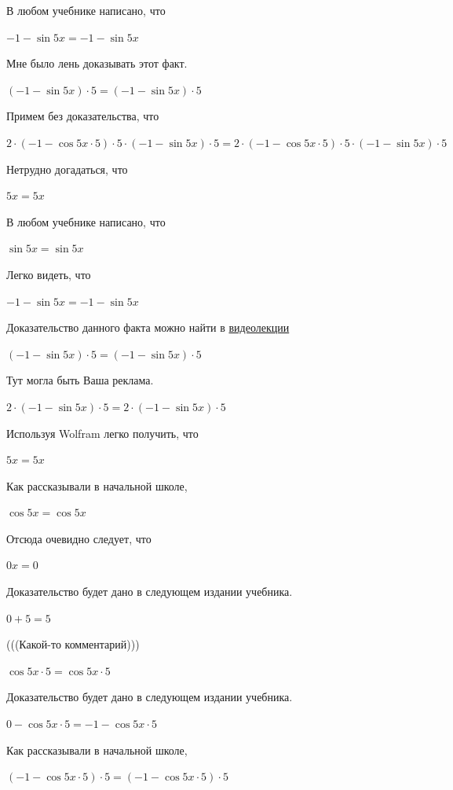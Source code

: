 \documentclass[12pt,a4paper,fleqn]{article}
\theoremstyle{definition}
\begin{document}
В любом учебнике написано, что 

$ -1  - \sin 5  x  =  -1  - \sin 5  x $

Мне было лень доказывать этот факт.

$( -1  - \sin 5  x ) \cdot  5  = ( -1  - \sin 5  x ) \cdot  5 $

Примем без доказательства, что 

$ 2  \cdot ( -1  - \cos 5  x  \cdot  5 ) \cdot  5  \cdot ( -1  - \sin 5  x ) \cdot  5  =  2  \cdot ( -1  - \cos 5  x  \cdot  5 ) \cdot  5  \cdot ( -1  - \sin 5  x ) \cdot  5 $

Нетрудно догадаться, что 

$ 5  x  =  5  x $

В любом учебнике написано, что 

$\sin 5  x  = \sin 5  x $

Легко видеть, что 

$ -1  - \sin 5  x  =  -1  - \sin 5  x $

Доказательство данного факта можно найти в \href{https://www.youtube.com/watch?v=dQw4w9WgXcQ}{видеолекции} 

$( -1  - \sin 5  x ) \cdot  5  = ( -1  - \sin 5  x ) \cdot  5 $

Тут могла быть Ваша реклама. 

$ 2  \cdot ( -1  - \sin 5  x ) \cdot  5  =  2  \cdot ( -1  - \sin 5  x ) \cdot  5 $

Используя Wolfram легко получить, что 

$ 5  x  =  5  x $

Как рассказывали в начальной школе, 

$\cos 5  x  = \cos 5  x $

Отсюда очевидно следует, что 

$ 0  x  =  0 $

Доказательство будет дано в следующем издании учебника. 

$ 0  +  5  =  5 $

(((Какой-то комментарий))) 

$\cos 5  x  \cdot  5  = \cos 5  x  \cdot  5 $

Доказательство будет дано в следующем издании учебника. 

$ 0  - \cos 5  x  \cdot  5  =  -1  - \cos 5  x  \cdot  5 $

Как рассказывали в начальной школе, 

$( -1  - \cos 5  x  \cdot  5 ) \cdot  5  = ( -1  - \cos 5  x  \cdot  5 ) \cdot  5 $
\end{document}
